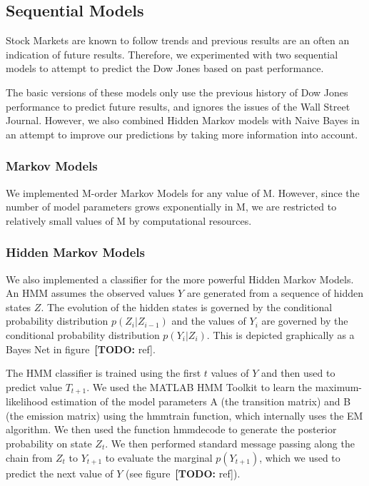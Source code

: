 \documentclass[10pt]{article}
\def\TODO#1{\noindent\textbf{[TODO:} #1]}
\begin{document}
\subsection{Sequential Models}
\label{sec:sequential-models}

Stock Markets are known to follow trends and previous results are an often an indication of future results.
Therefore, we experimented with two sequential models to attempt to predict the Dow Jones based on past performance.

The basic versions of these models only use the previous history of Dow Jones performance to predict future results, and ignores the issues of the Wall Street Journal.
However, we also combined Hidden Markov models with Naive Bayes in an attempt to improve our predictions by taking more information into account.

\subsubsection*{Markov Models}
\label{sec:}

We implemented M-order Markov Models for any value of M. However, since the number of model parameters grows exponentially in M, we are restricted to relatively small values of M by computational resources.

\subsubsection*{Hidden Markov Models}
\label{sec:}

We also implemented a classifier for the more powerful Hidden Markov Models. An HMM assumes the observed values $Y$ are generated from a sequence of hidden states $Z$.
The evolution of the hidden states is governed by the conditional probability distribution $p(Z_{i}|Z_{i-1})$ and the values of $Y_{i}$ are governed by the conditional probability distribution $p(Y_{i}|Z_{i})$.
This is depicted graphically as a Bayes Net in figure~\TODO{ref}.

The HMM classifier is trained using the first $t$ values of $Y$ and then used to predict value $T_{t+1}$.
We used the MATLAB HMM Toolkit to learn the maximum-likelihood estimation of the model parameters A (the transition matrix) and B (the emission matrix) using the hmmtrain function, which internally uses the EM algorithm.
We then used the function hmmdecode to generate the posterior probability on state $Z_{t}$.
We then performed standard message passing along the chain from $Z_{t}$ to $Y_{t+1}$ to evaluate the marginal $p(Y_{t+1})$, which we used to predict the next value of $Y$ (see figure~\TODO{ref}).
\end{document}
